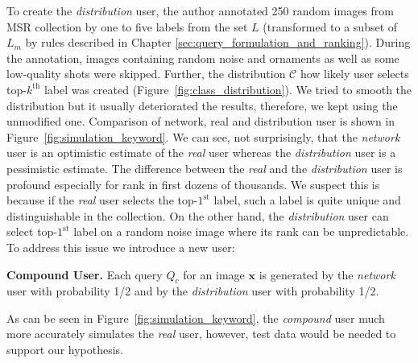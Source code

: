 To create the \textit{distribution} user, the author annotated 250 random images from MSR collection by one to five labels from the set $L$ (transformed to a subset of $L_m$ by rules described in Chapter \ref{sec:query_formulation_and_ranking}). During the annotation, images containing random noise and ornaments as well as some low-quality shots were skipped. Further, the distribution $\mathcal{C}$ how likely user selects top-$k^{\mathrm{th}}$ label was created (Figure~\ref{fig:class_distribution}). We tried to smooth the distribution but it usually deteriorated the results, therefore, we kept using the unmodified one. Comparison of network, real and distribution user is shown in Figure~\ref{fig:simulation_keyword}. We can see, not surprisingly, that the \textit{network} user is an optimistic estimate of the \textit{real} user whereas the \textit{distribution} user is a pessimistic estimate. The difference between the \textit{real} and the \textit{distribution} user is profound especially for rank in first dozens of thousands. We suspect this is because if the \textit{real} user selects the top-$1^{\mathrm{st}}$ label, such a label is quite unique and distinguishable in the collection. On the other hand, the \textit{distribution} user can select top-$1^{\mathrm{st}}$ label on a random noise image where its rank can be unpredictable. To address this issue we introduce a new user:
\begin{description}[labelwidth=1em, leftmargin=!]
	\item \textbf{Compound User.} Each query $Q_c$ for an image $\bm{x}$ is generated by the \textit{network} user with probability 1/2 and by the \textit{distribution} user with probability 1/2.
\end{description}
As can be seen in Figure~\ref{fig:simulation_keyword}, the \textit{compound} user much more accurately simulates the \textit{real} user, however, test data would be needed to support our hypothesis. 

